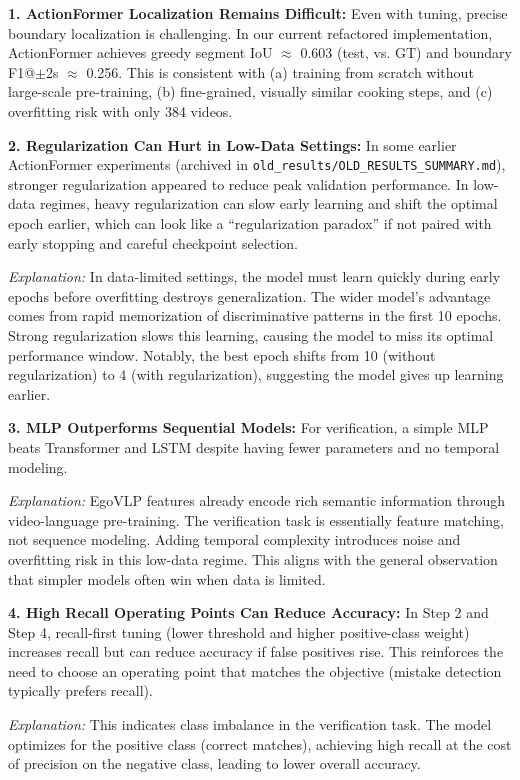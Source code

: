 \documentclass[10pt,twocolumn,letterpaper]{article}
\begin{document}
\textbf{1. ActionFormer Localization Remains Difficult:} Even with tuning, precise boundary localization is challenging. In our current refactored implementation, ActionFormer achieves greedy segment IoU $\approx$ 0.603 (test, vs. GT) and boundary F1@$\pm$2s $\approx$ 0.256. This is consistent with (a) training from scratch without large-scale pre-training, (b) fine-grained, visually similar cooking steps, and (c) overfitting risk with only 384 videos.

\textbf{2. Regularization Can Hurt in Low-Data Settings:} In some earlier ActionFormer experiments (archived in \texttt{old\_results/OLD\_RESULTS\_SUMMARY.md}), stronger regularization appeared to reduce peak validation performance. In low-data regimes, heavy regularization can slow early learning and shift the optimal epoch earlier, which can look like a ``regularization paradox'' if not paired with early stopping and careful checkpoint selection.

\textit{Explanation:} In data-limited settings, the model must learn quickly during early epochs before overfitting destroys generalization. The wider model's advantage comes from rapid memorization of discriminative patterns in the first 10 epochs. Strong regularization slows this learning, causing the model to miss its optimal performance window. Notably, the best epoch shifts from 10 (without regularization) to 4 (with regularization), suggesting the model gives up learning earlier.

\textbf{3. MLP Outperforms Sequential Models:} For verification, a simple MLP beats Transformer and LSTM despite having fewer parameters and no temporal modeling.

\textit{Explanation:} EgoVLP features already encode rich semantic information through video-language pre-training. The verification task is essentially feature matching, not sequence modeling. Adding temporal complexity introduces noise and overfitting risk in this low-data regime. This aligns with the general observation that simpler models often win when data is limited.

\textbf{4. High Recall Operating Points Can Reduce Accuracy:} In Step 2 and Step 4, recall-first tuning (lower threshold and higher positive-class weight) increases recall but can reduce accuracy if false positives rise. This reinforces the need to choose an operating point that matches the objective (mistake detection typically prefers recall).

\textit{Explanation:} This indicates class imbalance in the verification task. The model optimizes for the positive class (correct matches), achieving high recall at the cost of precision on the negative class, leading to lower overall accuracy.
\end{document}
